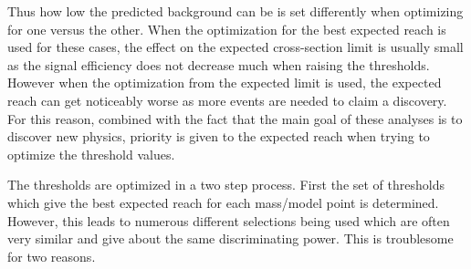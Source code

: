 Thus how low the predicted background can be is set differently when optimizing for one versus the other.
When the optimization for the best expected reach is used for these cases, the
effect on the expected cross-section limit is usually small as the signal efficiency does not decrease much when raising the thresholds. However
when the optimization from the expected limit is used, the expected reach can get noticeably worse as more events are needed to claim a discovery.
For this reason, combined with the fact that the main goal of these analyses is to discover new physics, priority
is given to the expected reach when trying to optimize the threshold values.



The thresholds are optimized in a two step process. First the set of thresholds which give the best expected reach for each mass/model point is determined. However, this leads
to numerous different selections being used which are often very similar and give about the same discriminating power. This is troublesome for two reasons. 

